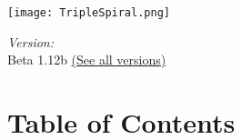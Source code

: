 \documentclass[a4paper,10pt]{article}
\begin{document}
\begin{titlepage}
\maketitle
\thispagestyle{empty}
\texttt{[image: TripleSpiral.png]}
\vfill
\begin{flushright} \large
\emph{Version:} \\
Beta 1.12b \href{https://github.com/jmeberlein/VancianToPsionics/releases}{(See all versions)}\\
\end{flushright}
\end{titlepage}
\section{Table of Contents}
\setlength{\columnsep}{0.5in}
\begin{multicols}{3} 
\scriptsize
\tableofcontents
\listoftables
\listoffigures
\normalsize
\end{multicols}
\newpage
\begin{multicols}{2}



\end{multicols}
\end{document}

